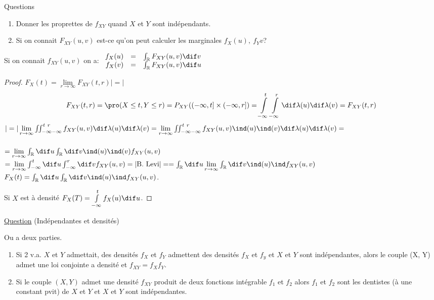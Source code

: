 Questions
\begin{enumerate}
	\item Donner les proprettes de $f_{XY}$ quand $X$ et $Y$ sont indépendants.
	\item Si on connait $F_{XY}(u, v)$ est-ce qu'on peut calculer les marginales $f_X(u),\ f_Y{v}$?
\end{enumerate}

\begin{proposition}[générale]
	Si on connait $f_{XY}(u, v)$ on a:
	$\begin{array}{rrl}f_X(u) & = & \int_\mathbb{R}F_{XY}(u,v)\dif v\\ f_X(v) & = & \int_\mathbb{R}F_{XY}(u,v)\dif u\end{array}$
\end{proposition}
\begin{proof}
	$F_X(t)=\lim\limits_{r\rightarrow\infty}F_{XY}(t, r)|=|$\\
	$$F_{XY}(t,r)=\pro (X\leq t, Y\leq r)=P_{XY}((-\infty, t]\times(-\infty, r])=\int\limits_{-\infty}^t\int\limits_{-\infty}^r\dif \lambda(u) \dif \lambda(v)=F_{XY}(t,r)$$
	$|=|\lim\limits_{r\rightarrow\infty}\iint_{-\infty -\infty}^{t\ r} f_{XY}(u, v)\dif \lambda(u) \dif \lambda(v)=\lim\limits_{r\rightarrow\infty}\iint_{-\infty -\infty}^{t\ r} f_{XY}(u, v)\ind (u)\ind (v)\dif \lambda(u) \dif \lambda(v)=$\\
	\\
	$=\lim\limits_{r\rightarrow\infty}\int_{\mathbb{R}} \dif u \int_{\mathbb{R}} \dif v \ind (u)\ind (v) f_{XY}(u, v)$
	$=\lim\limits_{r\rightarrow\infty}\int_{-\infty}^t \dif u \int_{-\infty}^r \dif v  f_{XY}(u, v) =|\text{B. Levi}|=
	=\int_{\mathbb{R}} \dif u \lim\limits_{r\rightarrow\infty} \int_{\mathbb{R}} \dif v \ind (u)\ind  f_{XY}(u, v)$
	$F_X(t)=\int_{\mathbb{R}} \dif u \int_{\mathbb{R}} \dif v \ind (u)\ind  f_{XY}(u, v)$.
	
	Si $X$ est à densité $F_X(T) = \int\limits_{-\infty}^t f_X(u) \dif u$.
\end{proof}

\underline{Question} (Indépendantes et densités)
\begin{proposition}
	Ou a deux parties.
	\begin{enumerate}
		\item Si 2 v.a. $X$ et $Y$ admettait, des densités $f_X$ et $f_Y$ admettent des densités $f_X$ et $f_y$ et $X$ et $Y$ sont indépendantes, alors le couple (X, Y) admet une loi conjointe a densité et $f_{XY}=f_X f_Y$.
		\item Si le couple $(X, Y)$ admet une densité $f_{XY}$ produit de deux fonctions intégrable $f_1$ et $f_2$ alors $f_1$ et $f_2$ sont les dentistes (à une constant pvit) de $X$ et $Y$ et $X$ et $Y$ sont indépendantes.
	\end{enumerate}
\end{proposition}

